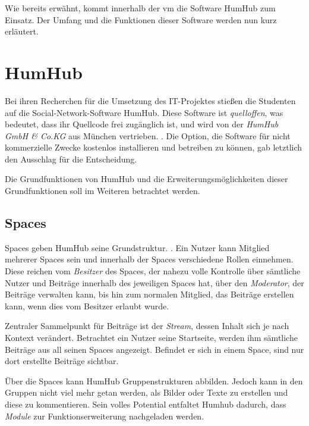 Wie bereits erwähnt, kommt innerhalb der \ac{vm} die Software HumHub zum Einsatz. Der Umfang und die Funktionen dieser Software werden nun kurz erläutert.

\section{HumHub}

Bei ihren Recherchen für die Umsetzung des IT-Projektes stießen die Studenten auf die Social-Network-Software HumHub. Diese Software ist \textit{quelloffen}, was bedeutet, dass ihr Quellcode frei zugänglich ist, und wird von der \textit{HumHub GmbH \& Co.KG} aus München vertrieben. 
 \citep{humhubmain}.
Die Option, die Software für nicht kommerzielle Zwecke kostenlos installieren und betreiben zu können, gab letztlich den Ausschlag für die Entscheidung.


Die Grundfunktionen von HumHub und die Erweiterungsmöglichkeiten dieser Grundfunktionen soll im Weiteren betrachtet werden.

\subsection{Spaces}

Spaces geben HumHub seine Grundstruktur.  \citep{spaces}. 
Ein Nutzer kann Mitglied mehrerer Spaces sein und innerhalb der Spaces verschiedene Rollen einnehmen. 
Diese reichen vom \textit{Besitzer} des Spaces, der nahezu volle Kontrolle über sämtliche Nutzer und Beiträge innerhalb des jeweiligen Spaces hat, über den \textit{Moderator}, der Beiträge verwalten kann, bis hin zum normalen Mitglied, das Beiträge erstellen kann, wenn dies vom Besitzer erlaubt wurde.  

Zentraler Sammelpunkt für Beiträge ist der \textit{Stream}, dessen Inhalt sich je nach Kontext verändert. Betrachtet ein Nutzer seine Startseite, werden ihm sämtliche Beiträge aus all seinen Spaces angezeigt. 
Befindet er sich in einem Space, sind nur dort erstellte Beiträge sichtbar.

Über die Spaces kann HumHub Gruppenstrukturen abbilden. 
Jedoch kann in den Gruppen nicht viel mehr getan werden, als Bilder oder Texte zu erstellen und diese zu kommentieren.
Sein volles Potential entfaltet Humhub dadurch, dass \textit{Module} zur Funktionserweiterung nachgeladen werden.

